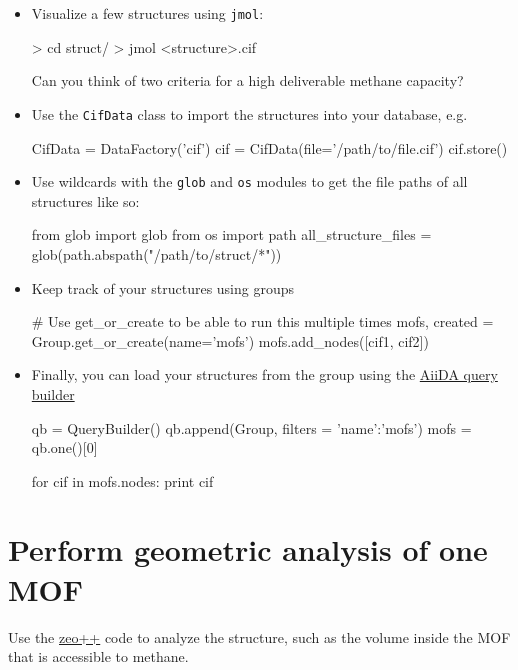 \documentclass[twoside,a4paper,11pt]{extarticle}
\begin{document}
\begin{itemize}
    \item Visualize a few structures using \verb|jmol|:
\begin{bashcommand}
> cd struct/
> jmol <structure>.cif
\end{bashcommand}
    Can you think of two criteria for a high deliverable
    methane capacity?
    
    \item Use the \verb|CifData| class to import the structures into your database, e.g.
    
    
\begin{pythoncommand}
CifData = DataFactory('cif')
cif = CifData(file='/path/to/file.cif')
cif.store()
\end{pythoncommand}

    \item Use wildcards with the \verb|glob| and \verb|os| modules to get the file paths of all structures like so:
\begin{pythoncommand}
from glob import glob
from os import path
all_structure_files = glob(path.abspath("/path/to/struct/*"))
\end{pythoncommand}

\item Keep track of your structures using groups
\begin{pythoncommand}
# Use get_or_create to be able to run this multiple times
mofs, created = Group.get_or_create(name='mofs')
mofs.add_nodes([cif1, cif2])
\end{pythoncommand}

\item Finally, you can load your structures from the group using the \href{http://aiida-core.readthedocs.io/en/latest/querying/querybuilder/usage.html}{AiiDA query builder}
\begin{pythoncommand}
qb = QueryBuilder()
qb.append(Group, filters = {'name':'mofs'})
mofs = qb.one()[0]

for cif in mofs.nodes:
  print cif
\end{pythoncommand}
\end{itemize}

\section{Perform geometric analysis of one MOF}
Use the \href{http://www.zeoplusplus.org/}{zeo++} code to
analyze the structure, such as the volume inside the MOF
that is accessible to methane.
\end{document}
